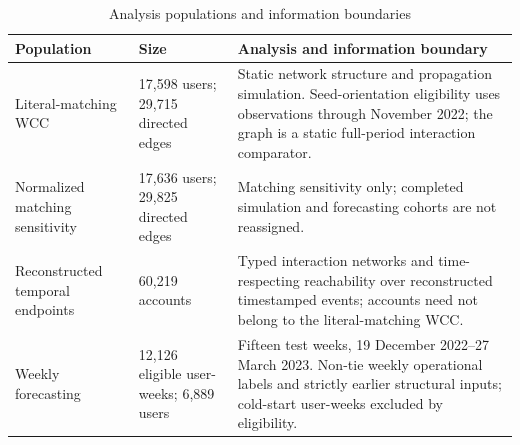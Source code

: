 \begin{table}[htbp]
\centering\small
\caption{Analysis populations and information boundaries}\label{tab:populations}
\begin{tabular}{p{3.1cm}p{2.4cm}p{6.8cm}}\toprule Population & Size & Analysis and information boundary\\\midrule
Literal-matching WCC & 17,598 users; 29,715 directed edges & Static network structure and propagation simulation. Seed-orientation eligibility uses observations through November 2022; the graph is a static full-period interaction comparator.\\
Normalized matching sensitivity & 17,636 users; 29,825 directed edges & Matching sensitivity only; completed simulation and forecasting cohorts are not reassigned.\\
Reconstructed temporal endpoints & 60,219 accounts & Typed interaction networks and time-respecting reachability over reconstructed timestamped events; accounts need not belong to the literal-matching WCC.\\
Weekly forecasting & 12,126 eligible user-weeks; 6,889 users & Fifteen test weeks, 19 December 2022--27 March 2023. Non-tie weekly operational labels and strictly earlier structural inputs; cold-start user-weeks excluded by eligibility.\\
\bottomrule\end{tabular}
\end{table}
